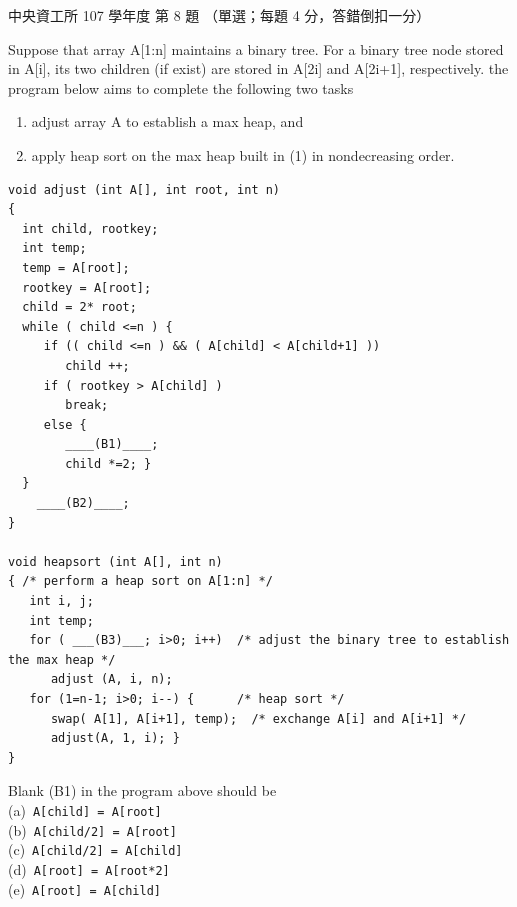 \begin{pastexam}[label={px:ncu-107-dsa-08}]{中央資工所 107 學年度 第 8 題}
（單選；每題 4 分，答錯倒扣一分）

Suppose that array A[1:n] maintains a binary tree. For a binary tree node stored in A[i], its two
children (if exist) are stored in A[2i] and A[2i+1], respectively. the program below aims to
complete the following two tasks
\begin{enumerate}[label=(\arabic*)]
\item adjust array A to establish a max heap, and
\item apply heap sort on the max heap built in (1) in nondecreasing order.
\end{enumerate}
\begin{verbatim}
void adjust (int A[], int root, int n)
{
  int child, rootkey;
  int temp;
  temp = A[root];
  rootkey = A[root];
  child = 2* root;
  while ( child <=n ) {
     if (( child <=n ) && ( A[child] < A[child+1] ))
        child ++;
     if ( rootkey > A[child] )
        break;
     else {
        ____(B1)____;
        child *=2; }
  }
    ____(B2)____;
}

void heapsort (int A[], int n)
{ /* perform a heap sort on A[1:n] */
   int i, j;
   int temp;
   for ( ___(B3)___; i>0; i++)  /* adjust the binary tree to establish the max heap */
      adjust (A, i, n);
   for (1=n-1; i>0; i--) {      /* heap sort */
      swap( A[1], A[i+1], temp);  /* exchange A[i] and A[i+1] */
      adjust(A, 1, i); }
}
\end{verbatim}

Blank (B1) in the program above should be\\
(a)~\texttt{A[child] = A[root]}\\
(b)~\texttt{A[child/2] = A[root]}\\
(c)~\texttt{A[child/2] = A[child]}\\
(d)~\texttt{A[root] = A[root*2]}\\
(e)~\texttt{A[root] = A[child]}
\end{pastexam}

